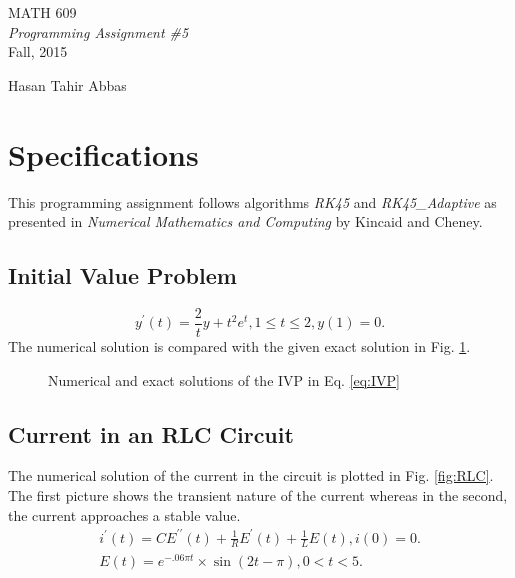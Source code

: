 \documentclass[11pt]{article}
\author{Hasan Tahir Abbas}
\begin{document}
\begin{titlepage}

\vspace*{55mm}
\begin{center}
{\huge MATH 609}\\[1cm]
{\em \huge Programming Assignment \#5}\\[70mm]
{\large Fall, 2015} \\[15mm]
\end{center}

\begin{flushright}
{\LARGE Hasan Tahir Abbas}
\end{flushright}

\vfill

\end{titlepage}
%
%
%
%
\newpage
\section{Specifications}

This programming assignment follows algorithms \textit{RK45} and \textit{RK45\_Adaptive} as presented in \textit{Numerical Mathematics and Computing} by Kincaid and Cheney. 

%
%
%
\subsection{Initial Value Problem}
\begin{equation}
y^{\prime}(t) = \frac{2}{t} y + t^2e^t, 1\leq t \leq 2, y(1) = 0.
\label{eq:IVP}
\end{equation}
The numerical solution is compared with the given exact solution in Fig. \ref{fig:IVP}.

\begin{figure}
     \centering
    		 {}
     \caption{Numerical and exact solutions of the IVP in Eq. \ref{eq:IVP} }
     \label{fig:IVP}
\end{figure}
%
%
%
%
\subsection{Current in an RLC Circuit}
The numerical solution of the current in the circuit is plotted in Fig. \ref{fig:RLC}. The first picture shows the transient nature of the current whereas in the second, the current approaches a stable value.
\begin{align*} 
i^{\prime}(t) = C E^{\prime\prime}(t) + \frac{1}{R} E^{\prime}(t) + \frac{1}{L} E(t), i(0) = 0.\\
E(t) = e^{-.06\pi t}\times \sin{(2t-\pi)}, 0 < t < 5.
\label{eq:RLC}
\end{align*} 
\end{document}
